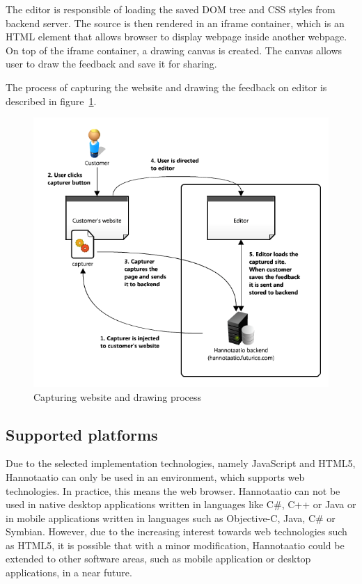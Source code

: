 \documentclass[english,12pt,a4paper,pdftex]{article}
\begin{document}
The editor is responsible of loading the saved \ac{DOM} tree and \ac{CSS} styles from backend server. The source is then rendered in an iframe container, which is an HTML element that allows browser to display webpage inside another webpage. On top of the iframe container, a drawing canvas is created. The canvas allows user to draw the feedback and save it for sharing.

The process of capturing the website and drawing the feedback on editor is described in figure~\ref{fig:hannotaatio_architecture}.

\begin{figure}[htb]
\begin{center}
\includegraphics[width=1.0\textwidth]{hannotaatio_architecture.png}
\end{center}
\caption{Capturing website and drawing process}
\label{fig:hannotaatio_architecture}
\end{figure}

\subsection{Supported platforms}

Due to the selected implementation technologies, namely JavaScript and HTML5, Hannotaatio can only be used in an environment, which supports web technologies. In practice, this means the web browser. Hannotaatio can not be used in native desktop applications written in languages like C#, C++ or Java or in mobile applications written in languages such as Objective-C, Java, C# or Symbian. However, due to the increasing interest towards web technologies such as HTML5, it is possible that with a minor modification, Hannotaatio could be extended to other software areas, such as mobile application or desktop applications, in a near future.
\end{document}
